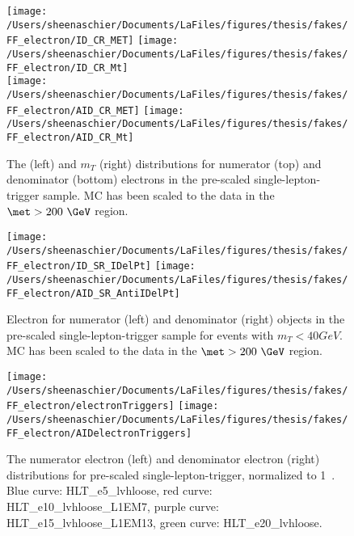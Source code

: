 \begin{figure}[tbp]
  \centering
  \texttt{[image: /Users/sheenaschier/Documents/LaFiles/figures/thesis/fakes/FF\_electron/ID\_CR\_MET]}
  \texttt{[image: /Users/sheenaschier/Documents/LaFiles/figures/thesis/fakes/FF\_electron/ID\_CR\_Mt]}\\
  \texttt{[image: /Users/sheenaschier/Documents/LaFiles/figures/thesis/fakes/FF\_electron/AID\_CR\_MET]}
  \texttt{[image: /Users/sheenaschier/Documents/LaFiles/figures/thesis/fakes/FF\_electron/AID\_CR\_Mt]}
  \caption{The \met{} (left) and $m_{T}$ (right) distributions for numerator (top) and denominator (bottom) electrons in the pre-scaled single-lepton-trigger sample.  MC has been scaled to the data in the $\met > 200~\GeV$ region.}
  \label{fig:elec_FF_dists_1}
\end{figure}

\begin{figure}[tbp]
  \centering
  \texttt{[image: /Users/sheenaschier/Documents/LaFiles/figures/thesis/fakes/FF\_electron/ID\_SR\_IDelPt]}
  \texttt{[image: /Users/sheenaschier/Documents/LaFiles/figures/thesis/fakes/FF\_electron/AID\_SR\_AntiIDelPt]}\\
  \caption{Electron \pt{} for numerator (left) and denominator (right) objects in the pre-scaled single-lepton-trigger sample for events with $m_{T} < 40 GeV$.  MC has been scaled to the data in the $\met > 200~\GeV$ region.}
  \label{fig:elec_FF_dists_pt}
\end{figure}

\begin{figure}[tbp]
  \centering
  \texttt{[image: /Users/sheenaschier/Documents/LaFiles/figures/thesis/fakes/FF\_electron/electronTriggers]}
  \texttt{[image: /Users/sheenaschier/Documents/LaFiles/figures/thesis/fakes/FF\_electron/AIDelectronTriggers]}\\
  \caption{The numerator electron (left) and denominator electron (right) \pt{} distributions for pre-scaled single-lepton-trigger, normalized to 1~\ipb{}. Blue curve: HLT\_e5\_lvhloose, red curve: HLT\_e10\_lvhloose\_L1EM7, purple curve: HLT\_e15\_lvhloose\_L1EM13, green curve: HLT\_e20\_lvhloose.}
  \label{fig:triggers}
\end{figure}


